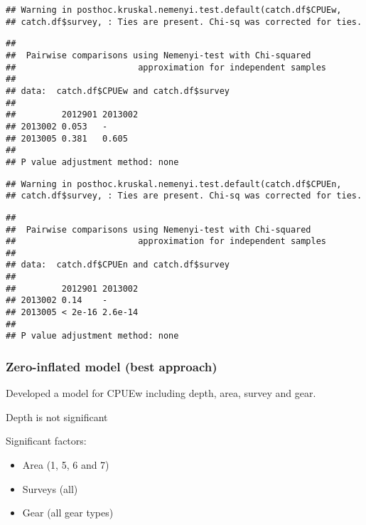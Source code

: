 \documentclass[]{article}
\newenvironment{Shaded}{\begin{snugshade}}{\end{snugshade}}
\newcommand{\KeywordTok}[1]{\textcolor[rgb]{0.13,0.29,0.53}{\textbf{#1}}}
\newcommand{\StringTok}[1]{\textcolor[rgb]{0.31,0.60,0.02}{#1}}
\newcommand{\OperatorTok}[1]{\textcolor[rgb]{0.81,0.36,0.00}{\textbf{#1}}}
\newcommand{\NormalTok}[1]{#1}
\providecommand{\tightlist}{%
  \setlength{\itemsep}{0pt}\setlength{\parskip}{0pt}}
\begin{document}
\begin{verbatim}
## Warning in posthoc.kruskal.nemenyi.test.default(catch.df$CPUEw,
## catch.df$survey, : Ties are present. Chi-sq was corrected for ties.
\end{verbatim}

\begin{verbatim}
## 
##  Pairwise comparisons using Nemenyi-test with Chi-squared    
##                        approximation for independent samples 
## 
## data:  catch.df$CPUEw and catch.df$survey 
## 
##         2012901 2013002
## 2013002 0.053   -      
## 2013005 0.381   0.605  
## 
## P value adjustment method: none
\end{verbatim}

\begin{Shaded}
\end{Shaded}

\begin{verbatim}
## Warning in posthoc.kruskal.nemenyi.test.default(catch.df$CPUEn,
## catch.df$survey, : Ties are present. Chi-sq was corrected for ties.
\end{verbatim}

\begin{verbatim}
## 
##  Pairwise comparisons using Nemenyi-test with Chi-squared    
##                        approximation for independent samples 
## 
## data:  catch.df$CPUEn and catch.df$survey 
## 
##         2012901 2013002
## 2013002 0.14    -      
## 2013005 < 2e-16 2.6e-14
## 
## P value adjustment method: none
\end{verbatim}

\subsubsection{Zero-inflated model (best
approach)}\label{zero-inflated-model-best-approach}

Developed a model for CPUEw including depth, area, survey and gear.

Depth is not significant

Significant factors:

\begin{itemize}
\tightlist
\item
  Area (1, 5, 6 and 7)
\item
  Surveys (all)
\item
  Gear (all gear types)
\end{itemize}
\end{document}
